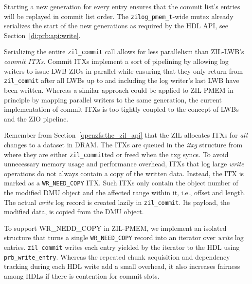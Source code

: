 \documentclass[12pt,a4paper,twoside]{book}
\begin{document}
{\begin{description}
        Starting a new generation for every entry ensures that the commit list's entries will be replayed in commit list order.
        The \lstinline{zilog_pmem_t}-wide mutex already serializes the start of the new generations as required by the HDL API, see Section~\ref{di:prb:api:write}.

        Serializing the entire \lstinline{zil_commit} call allows for less parallelism than ZIL-LWB's \textit{commit ITXs}.
        Commit ITXs implement a sort of pipelining by allowing log writers to issue LWB ZIOs in parallel while ensuring that they only return from \lstinline{zil_commit} after all LWBs up to and including the log writer's last LWB have been written.
        Whereas a similar approach could be applied to ZIL-PMEM in principle by mapping parallel writers to the same generation, the current implementation of commit ITXs is too tightly coupled to the concept of LWBs and the ZIO pipeline.

    \item[WR\_NEED\_COPY Chunking]
        Remember from Section~\ref{openzfs:the_zil_api} that the ZIL allocates ITXs for \textit{all} changes to a dataset in DRAM.
        The ITXs are queued in the \textit{itxg} structure from where they are either \lstinline{zil_commit}ted or freed when the txg syncs.
        To avoid unnecessary memory usage and performance overhead, ITXs that log large \textit{write} operations do not always contain a copy of the written data.
        Instead, the ITX is marked as a \lstinline{WR_NEED_COPY} ITX.
        Such ITXs only contain the object number of the modified DMU object and the affected range within it, i.e., offset and length.
        The actual \textit{write} log record is created lazily in \lstinline{zil_commit}.
        Its payload, the modified data, is copied from the DMU object.

        To support WR\_NEDD\_COPY in ZIL-PMEM, we implement an isolated structure that turns a single \lstinline{WR_NEED_COPY} record into an iterator over \textit{write} log entries.
        \lstinline{zil_commit} writes each entry yielded by the iterator to the HDL using \lstinline{prb_write_entry}.
        Whereas the repeated chunk acquisition and dependency tracking during each HDL write add a small overhead, it also increases fairness among HDLs if there is contention for commit slots.


\end{description}}
\end{document}
